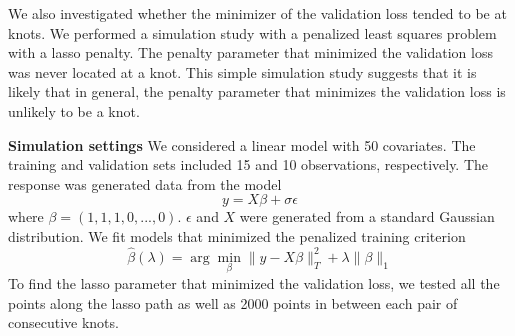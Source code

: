 \documentclass[]{article}
\begin{document}
\begin{enumerate}
		We also investigated whether the minimizer of the validation loss tended to be at knots. We performed a simulation study with a penalized least squares problem with a lasso penalty. The penalty parameter that minimized the validation loss was never located at a knot. This simple simulation study suggests that it is likely that in general, the penalty parameter that minimizes the validation loss is unlikely to be a knot. 
		
		\textbf{Simulation settings} We considered a linear model with 50 covariates. The training and validation sets included 15 and 10 observations, respectively. The response was generated data from the model
		$$
		y = X\beta + \sigma\epsilon
		$$
		where $\beta = (1, 1, 1, 0, ..., 0)$. $\epsilon$ and $X$ were generated from a standard Gaussian distribution. We fit models that minimized the penalized training criterion
		$$
		\hat{\beta}(\lambda) = \arg\min_{\beta} \| y - X\beta \|_T^2 + \lambda \|\beta\|_1
		$$
		To find the lasso parameter that minimized the validation loss, we tested all the points along the lasso path as well as 2000 points in between each pair of consecutive knots.
		
	\end{enumerate}
\end{document}
